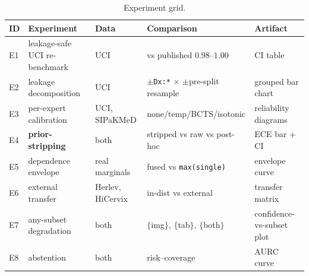 \documentclass[sigplan,nonacm,screen]{acmart}
\begin{document}
\begin{table}[t]
\caption{Experiment grid.}
\label{tab:expgrid}
\footnotesize
\setlength{\tabcolsep}{4pt}
\begin{tabular}{@{}llp{2.6cm}p{3.2cm}p{3.4cm}@{}}
\toprule
\textbf{ID} & \textbf{Experiment} & \textbf{Data} & \textbf{Comparison} & \textbf{Artifact} \\
\midrule
E1 & leakage-safe UCI re-benchmark & UCI & vs published $0.98$--$1.00$ & CI table \\
E2 & leakage decomposition & UCI & $\pm$\texttt{Dx:*} $\times$ $\pm$pre-split resample & grouped bar chart \\
E3 & per-expert calibration & UCI, SIPaKMeD & none/temp/BCTS/isotonic & reliability diagrams \\
E4 & \textbf{prior-stripping} & both & stripped vs raw vs post-hoc & ECE bar $+$ CI \\
E5 & dependence envelope & real marginals & fused vs \texttt{max(single)} & envelope curve \\
E6 & external transfer & Herlev, HiCervix & in-dist vs external & transfer matrix \\
E7 & any-subset degradation & both & $\{$img$\}$, $\{$tab$\}$, $\{$both$\}$ & confidence-vs-subset plot \\
E8 & abstention & both & risk--coverage & AURC curve \\
\bottomrule
\end{tabular}
\end{table}
\end{document}
